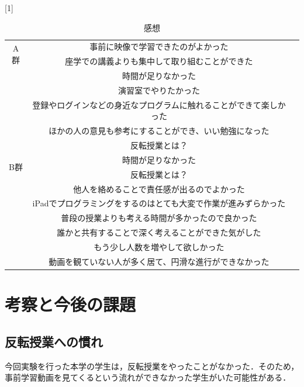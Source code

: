 \documentclass[a4j,11pt]{jsarticle}
\begin{document}
\begin{table}[htbp]
\begin{center}
\caption{感想}
\scalebox{1}[1]{
\begin{tabular}{|c|c|c|}
\cline{1-2}
\multicolumn{1}{|c|}{\multirow{2}{*}{A群}} &  事前に映像で学習できたのがよかった  \\ \cline{2-2}  
\multicolumn{1}{|c|}{} & 座学での講義よりも集中して取り組むことができた  \\ \cline{2-2}  
\multicolumn{1}{|c|}{} & 時間が足りなかった  \\ \cline{2-2}  
\multicolumn{1}{|c|}{} & 演習室でやりたかった  \\ \cline{2-2}  
\multicolumn{1}{|c|}{} & 登録やログインなどの身近なプログラムに触れることができて楽しかった \\ \cline{2-2} 
\multicolumn{1}{|c|}{} &  ほかの人の意見も参考にすることができ、いい勉強になった \\ \cline{2-2} 
\multicolumn{1}{|c|}{} &  反転授業とは？ \\ \cline{1-2} 
 \multicolumn{1}{|c|}{\multirow{2}{*}{B群}} & 時間が足りなかった  \\ \cline{2-2}  
\multicolumn{1}{|c|}{} & 反転授業とは？  \\ \cline{2-2}  
\multicolumn{1}{|c|}{} & 他人を絡めることで責任感が出るのでよかった \\ \cline{2-2}  
\multicolumn{1}{|c|}{} &  iPadでプログラミングをするのはとても大変で作業が進みずらかった \\ \cline{2-2}  
\multicolumn{1}{|c|}{} &  普段の授業よりも考える時間が多かったので良かった \\ \cline{2-2}  
\multicolumn{1}{|c|}{} &  誰かと共有することで深く考えることができた気がした \\ \cline{2-2}  
\multicolumn{1}{|c|}{} & もう少し人数を増やして欲しかった  \\ \cline{2-2}  
\multicolumn{1}{|c|}{} & 動画を観ていない人が多く居て、円滑な進行ができなかった  \\ \cline{1-2}  
\end{tabular}
}
\label{anke18}
\end{center}
\end{table}



\newpage
\section{考察と今後の課題}
\subsection{反転授業への慣れ}
今回実験を行った本学の学生は，反転授業をやったことがなかった．そのため，事前学習動画を見てくるという流れができなかった学生がいた可能性がある．
\end{document}
